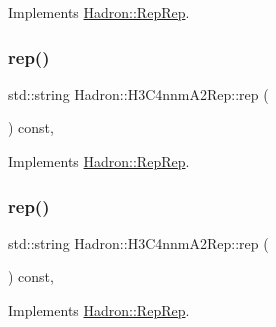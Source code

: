 Implements \mbox{\hyperlink{structHadron_1_1RepRep_ab3213025f6de249f7095892109575fde}{Hadron\+::\+Rep\+Rep}}.

\mbox{\label{structHadron_1_1H3C4nnmA2Rep_a2e3cc9bd16d8097b2b57f500b0d82be1}} 
\subsubsection{\texorpdfstring{rep()}{rep()}\hspace{0.1cm}{\footnotesize\ttfamily [2/5]}}
{\footnotesize\ttfamily std\+::string Hadron\+::\+H3\+C4nnm\+A2\+Rep\+::rep (\begin{DoxyParamCaption}{ }\end{DoxyParamCaption}) const\hspace{0.3cm}{\ttfamily [inline]}, {\ttfamily [virtual]}}



Implements \mbox{\hyperlink{structHadron_1_1RepRep_ab3213025f6de249f7095892109575fde}{Hadron\+::\+Rep\+Rep}}.

\mbox{\label{structHadron_1_1H3C4nnmA2Rep_a2e3cc9bd16d8097b2b57f500b0d82be1}} 
\subsubsection{\texorpdfstring{rep()}{rep()}\hspace{0.1cm}{\footnotesize\ttfamily [3/5]}}
{\footnotesize\ttfamily std\+::string Hadron\+::\+H3\+C4nnm\+A2\+Rep\+::rep (\begin{DoxyParamCaption}{ }\end{DoxyParamCaption}) const\hspace{0.3cm}{\ttfamily [inline]}, {\ttfamily [virtual]}}



Implements \mbox{\hyperlink{structHadron_1_1RepRep_ab3213025f6de249f7095892109575fde}{Hadron\+::\+Rep\+Rep}}.

\mbox{\label{structHadron_1_1H3C4nnmA2Rep_a2e3cc9bd16d8097b2b57f500b0d82be1}} 
